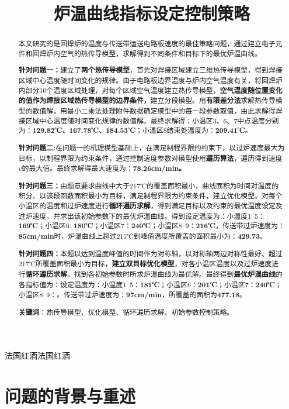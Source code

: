 \documentclass[withoutpreface,bwprint]{cumcmthesis} %
\title{炉温曲线指标设定控制策略}
\numberwithin{equation}{subsection}
\begin{document}
 \maketitle
 \begin{abstract}
本文研究的是回焊炉的温度与传送带运送电路板速度的最佳策略问题，通过建立电子元件和回焊炉内空气的热传导模型，求解得到不同条件和目标下的最优炉温曲线。

\textbf{针对问题一：}建立了\textbf{两个热传导模型}，首先对焊接区域建立三维热传导模型，得到焊接区域中心温度随时间变化的规律。由于电路板边界温度与炉内空气温度有关，将回焊炉内部分10个温度区域处理，对每个区域空气温度建立热传导模型，\textbf{空气温度随位置变化的值作为焊接区域热传导模型的边界条件，}建立分段模型。用\textbf{有限差分法}求解热传导模型的数值解，用最小二乘法处理附件数据确定模型中的每一段参数取值，由此求解得焊接区域中心温度随时间变化规律的数值解。最终求解得：小温区3、6、7中点温度分别为：\textbf{129.82℃、167.78℃、184.53℃}；小温区8结束处温度为：\textbf{209.41℃}。

\textbf{针对问题二:}在问题一的机理模型基础上，在满足制程界限的约束下，以过炉速度最大为目标，以制程界限为约束条件，通过控制速度参数对模型使用\textbf{遍历算法}，遍历得到速度$v$的最大值。最终求解得最大速度为：\textbf{78.26cm/min。}

\textbf{针对问题三：}由题意要求曲线中大于217℃的覆盖面积最小，曲线面积为时间对温度的积分。以该段函数面积最小为目标，满足制程界限为约束条件，建立优化模型。对每个小温区的温度和过炉速度进行\textbf{循环遍历求解}，得到满足目标以及约束的最优温度设定及过炉速度，并求出该初始参数下的最优炉温曲线。得到设定温度为：小温度1~5：\textbf{169℃}；小温区6: \textbf{180℃}；小温区7：\textbf{240℃}；小温区8~9：\textbf{216℃}，传送带过炉速度为：\textbf{85cm/min}时，炉温曲线上超过217℃到峰值温度所覆盖的面积最小为：\textbf{429.73}。

\textbf{针对问题四：}本题以达到温度峰值的时间作为对称轴，以对称轴两边对称性最好、超过217℃所覆盖面积最小为目标，\textbf{建立双目标优化模型}，对各小温区温度以及过炉速度进行\textbf{循环遍历求解}，找到各初始参数时所求炉温曲线为最优解。最终得到\textbf{最优炉温曲线}的各指标值为：设定温度为：小温度1~5：\textbf{181℃}；小温区6：\textbf{201℃}；小温区7：\textbf{240℃}；小温区8~9：。传送带过炉速度为：\textbf{97cm/min}，所覆盖的面积为\textbf{477.18}。

\textbf{关键词}：热传导模型、优化模型、循环遍历求解、初始参数控制策略。
\end{abstract}


法国红酒法国红酒


\section{问题的背景与重述}
\end{document}
